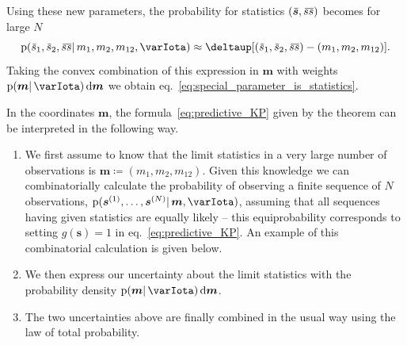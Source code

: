 \documentclass[\ifafour a4paper,12pt,\else a5paper,10pt,\fi%
onecolumn,oneside,article,%
british%
]{memoir}
\theoremstyle{remark}
\theoremstyle{innote}
\newcommand*{\delt}{\deltaup}%
\newcommand*{\di}{\mathrm{d}}%
\newcommand*{\defd}{\coloneqq}
\newcommand*{\pf}{\mathrm{p}}%
\renewcommand*{\|}{\mathpunct{|}}
\newcommand*{\eqn}{eq.}%
\newcommand*{\widebar}[1]{{\mkern1.5mu\skew{2}\overline{\mkern-1.5mu#1\mkern-1.5mu}\mkern 1.5mu}}
\newcommand*{\yI}{\varIota}
\newcommand*{\ys}{\bm{s}}
\newcommand*{\yso}[1]{\ys^{(#1)}}
\newcommand*{\yt}{\bm{m}}
\newcommand*{\yl}{m_{12}}
\newcommand*{\yav}{\widebar{\ys}}
\newcommand*{\yavv}{\widebar{s}}
\newcommand*{\ycv}{\widebar{ss}}
\begin{document}
Using these new parameters, the probability for statistics $(\yav,\ycv)$
becomes for large $N$
\begin{equation}
  \label{eq:prob_stat_newparams}
  \pf(\yavv_1,\yavv_2,\ycv \|m_1,m_2,\yl,\yI)
  \approx \delt[(\yavv_1,\yavv_2,\ycv)- (m_1, m_2, \yl)].
\end{equation}
Taking the convex combination of this expression in $\yt$ with weights
$\pf(\yt \|\yI)\,\di\yt$ we obtain
\eqn~\eqref{eq:special_parameter_is_statistics}.

\bigskip

In the coordinates $\yt$, the formula~\eqref{eq:predictive_KP} given
by the theorem can be interpreted in the following way.
\begin{enumerate}[label=(\textit{\arabic*})]
\item We first assume to know that the limit statistics in a very large
  number of observations is $\yt \defd (m_1, m_2, \yl)$. Given this knowledge
  we can combinatorially calculate the probability of observing a finite
  sequence of $N$ observations, $\pf(\yso{1}, \dotsc, \yso{N} \|\yt,\yI)$,
  assuming that all sequences having given statistics are equally likely --
  this equiprobability corresponds to setting $g(\ys)=1$ in
  \eqn~\eqref{eq:predictive_KP}. An example of this combinatorial
  calculation is given below.
\item We then express our uncertainty about the limit statistics with the
  probability density $\pf(\yt \| \yI)\,\di\yt$.
\item The two uncertainties above are finally combined in the usual way
  using the law of total probability.
\end{enumerate}

\smallskip
\end{document}
